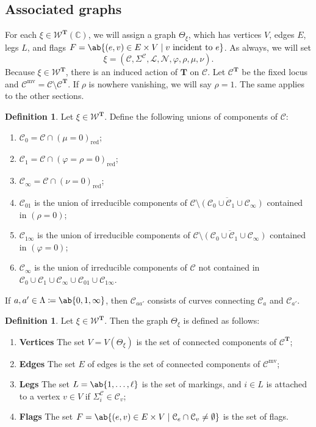 \documentclass{amsart}
\theoremstyle{definition}
\newtheorem{defn}[thm]{Definition}
\theoremstyle{remark}
\theoremstyle{plain}
\theoremstyle{definition}
\theoremstyle{remark}
\newcommand{\C}{\mathbb{C}}
\newcommand{\T}{\mathbf{T}}
\newcommand{\mc}[1]{\mathcal{#1}}
\newcommand{\mr}[1]{\mathrm{#1}}
\newcommand{\ol}[1]{\overline{#1}}
\newcommand{\1}{\mathbf{1}}
\newcommand{\2}{\mathbf{2}}
\newcommand{\3}{\mathbf{3}}
\begin{document}
\subsection{Associated graphs}

For each $\xi \in \mc{W}^{\T}(\C)$, we will assign a graph $\Theta_{\xi}$, which has vertices $V$, edges $E$, legs $L$, and flags $F = \ab\{(e,v) \in E \times V \mid v \text{ incident to }e\}$. As always, we will set
\[ \xi = (\mc{C}, \Sigma^{\mc{C}}, \mc{L}, \mc{N}, \varphi,\rho,\mu,\nu). \]
Because $\xi \in \mc{W}^{\T}$, there is an induced action of $\T$ on $\mc{C}$. Let $\mc{C}^{\T}$ be the fixed locus and $\mc{C}^{\mr{mv}} = \mc{C} \setminus \mc{C}^{\T}$. If $\rho$ is nowhere vanishing, we will say $\rho = 1$. The same applies to the other sections.

\begin{defn}
    Let $\xi \in \mc{W}^{\T}$. Define the following unions of components of $\mc{C}$:
    \begin{enumerate}
        \item $\mc{C}_0 = \mc{C} \cap (\mu = 0)_{\mr{red}}$;
        \item $\mc{C}_1 = \mc{C} \cap (\varphi = \rho = 0)_{\mr{red}}$;
        \item $\mc{C}_{\infty} = \mc{C} \cap (\nu = 0)_{\mr{red}}$;
        \item $\mc{C}_{01}$ is the union of irreducible components of $\ol{\mc{C} \setminus (\mc{C}_0 \cup \mc{C}_1 \cup \mc{C}_{\infty})}$ contained in $(\rho = 0)$;
        \item $\mc{C}_{1\infty}$ is the union of irreducible components of $\ol{\mc{C} \setminus (\mc{C}_0 \cup \mc{C}_1 \cup \mc{C}_{\infty})}$ contained in $(\varphi = 0)$;
        \item $\mc{C}_{\infty}$ is the union of irreducible components of $\mc{C}$ not contained in $\mc{C}_0 \cup \mc{C}_1 \cup \mc{C}_{\infty} \cup \mc{C}_{01} \cup \mc{C}_{1\infty}$.
    \end{enumerate}
\end{defn}

If $a,a' \in \Lambda \coloneqq \ab\{0,1,\infty\}$, then $\mc{C}_{aa'}$ consists of curves connecting $\mc{C}_a$ and $\mc{C}_{a'}$.

\begin{defn}
    Let $\xi \in \mc{W}^{\T}$. Then the graph $\Theta_{\xi}$ is defined as follows:
    \begin{enumerate}
        \item\textbf{Vertices } The set $V = V(\Theta_{\xi})$ is the set of connected components of $\mc{C}^{\T}$; 
        \item\textbf{Edges } The set $E$ of edges is the set of connected components of $\mc{C}^{\mr{mv}}$;
        \item\textbf{Legs } The set $L = \ab\{1,\ldots,\ell\}$ is the set of markings, and $i \in L$ is attached to a vertex $v \in V$ if $\Sigma_i^{\mc{C}} \in \mc{C}_v$;
        \item\textbf{Flags } The set $F = \ab\{(e,v) \in E \times V \mid \mc{C}_e \cap \mc{C}_v \neq \emptyset\}$ is the set of flags.
    \end{enumerate}
\end{defn}
\end{document}
